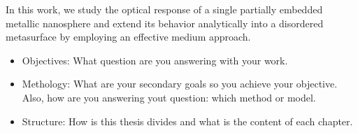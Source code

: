  
 In this work, we study the optical response of a single partially embedded metallic nanosphere  and extend its behavior analytically into a disordered metasurface by employing an effective medium approach.





\begin{itemize}
	\item Objectives: What question are you answering with your work.\\
	\item Methology: What are your secondary goals so you achieve your objective. Also, how are you answering yout question: which method or model.\\
	\item Structure: How is this thesis divides and what is the content of each chapter.
\end{itemize}





















